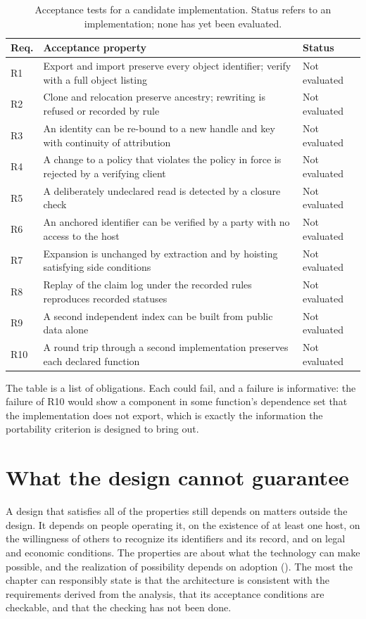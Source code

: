 \documentclass[11pt,twoside,openright]{book}
\theoremstyle{plain}
\theoremstyle{definition}
\theoremstyle{remark}
\begin{document}
\begin{table}[t]
\centering
\caption{Acceptance tests for a candidate implementation. Status refers to an implementation; none has yet been evaluated.}
\label{tab:acceptance}
\small
\begin{tabular}{p{}p{}p{}}
\toprule
Req. & Acceptance property & Status \\
\midrule
R1 & Export and import preserve every object identifier; verify with a full object listing & Not evaluated \\
R2 & Clone and relocation preserve ancestry; rewriting is refused or recorded by rule & Not evaluated \\
R3 & An identity can be re-bound to a new handle and key with continuity of attribution & Not evaluated \\
R4 & A change to a policy that violates the policy in force is rejected by a verifying client & Not evaluated \\
R5 & A deliberately undeclared read is detected by a closure check & Not evaluated \\
R6 & An anchored identifier can be verified by a party with no access to the host & Not evaluated \\
R7 & Expansion is unchanged by extraction and by hoisting satisfying side conditions & Not evaluated \\
R8 & Replay of the claim log under the recorded rules reproduces recorded statuses & Not evaluated \\
R9 & A second independent index can be built from public data alone & Not evaluated \\
R10 & A round trip through a second implementation preserves each declared function & Not evaluated \\
\bottomrule
\end{tabular}
\end{table}

The table is a list of obligations. Each could fail, and a failure is informative: the failure of R10 would show a component in some function's dependence set that the implementation does not export, which is exactly the information the portability criterion is designed to bring out.

\section{What the design cannot guarantee}

A design that satisfies all of the properties still depends on matters outside the design. It depends on people operating it, on the existence of at least one host, on the willingness of others to recognize its identifiers and its record, and on legal and economic conditions. The properties are about what the technology can make possible, and the realization of possibility depends on adoption (). The most the chapter can responsibly state is that the architecture is consistent with the requirements derived from the analysis, that its acceptance conditions are checkable, and that the checking has not been done.
\end{document}
